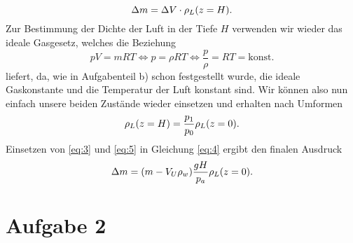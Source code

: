 \documentclass{exercise}
\begin{document}
\begin{enumerate}
\begin{equation}
            \Delta m = \Delta V \cdot \rho_L\parentheses*{z = H}.
        \end{equation}
        Zur Bestimmung der Dichte der Luft in der Tiefe \(H\) verwenden wir wieder das ideale Gasgesetz, welches die Beziehung
        \[
            pV = mRT \iff p = \rho RT \iff \frac{p}{\rho} = RT = \text{konst.}
        \]
        liefert, da, wie in Aufgabenteil b) schon festgestellt wurde, die ideale Gaskonstante und die Temperatur der Luft konstant sind.
        Wir können also nun einfach unsere beiden Zustände wieder einsetzen und erhalten nach Umformen
        \begin{equation}\label{eq:5}
            \rho_L\parentheses*{z = H} = \frac{p_1}{p_0}\rho_L\parentheses*{z = 0}.
        \end{equation}
        Einsetzen von \eqref{eq:3} und \eqref{eq:5} in Gleichung \eqref{eq:4} ergibt den finalen Ausdruck
        \[
            \Delta m = \parentheses*{m - V_U \rho_w}\frac{gH}{p_a}\rho_L\parentheses*{z = 0}.
        \]
    \end{enumerate}


    \section*{Aufgabe 2}
\end{document}

